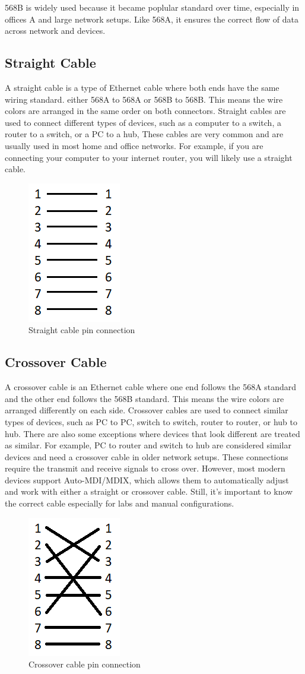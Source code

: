 \documentclass[a4paper,12pt]{report}
\begin{document}
568B is widely used because it became poplular standard over time, especially in offices A and large network setups. Like 568A, it ensures the correct flow of data across network and devices. 
\newpage
\subsection*{Straight Cable}
A straight cable is a type of Ethernet cable where both ends have the same wiring standard. either 568A to 568A or 568B to 568B. This means the wire colors are arranged in the same order on both connectors. Straight cables are used to connect different types of devices, such as a computer to a switch, a router to a switch, or a PC to a hub, These cables are very common and are usually used in most home and office networks. For example, if you are connecting your computer to your internet router, you will likely use a straight cable.
\begin{figure}[h]
    \centering
    \includegraphics[width=0.2\linewidth]{straight-cable.png}
    \caption{Straight cable pin connection}
\end{figure}
\subsection*{Crossover Cable}
A crossover cable is an Ethernet cable where one end follows the 568A standard and the other end follows the 568B standard. This means the wire colors are arranged differently on each side. Crossover cables are used to connect similar types of devices, such as PC to PC, switch to switch, router to router, or hub to hub. There are also some exceptions where devices that look different are treated as similar. For example, PC to router and switch to hub are considered similar devices and need a crossover cable in older network setups. These connections require the transmit and receive signals to cross over. However, most modern devices support Auto-MDI/MDIX, which allows them to automatically adjust and work with either a straight or crossover cable. Still, it's important to know the correct cable especially for labs and manual configurations.
\begin{figure}[h]
    \centering
    \includegraphics[width=0.2\linewidth]{crossover_cable.png}
    \caption{Crossover cable pin connection}
\end{figure}
\newpage
\end{document}

